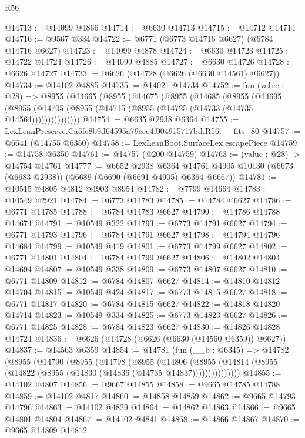 \begin{lexlean}{R56}
\begin{coremodule}
@14713 := @14099 @4866
@14714 := @6630 @14713
@14715 := @14712 @14714
@14716 := @9567 @334
@14722 := @6771 (@6773 @14716 @6627) (@6784 @14716 @6627)
@14723 := @14099 @4878
@14724 := @6630 @14723
@14725 := @14722 @14724
@14726 := @14099 @4885
@14727 := @6630 @14726
@14728 := @6626 @14727
@14733 := @6626 (@14728 (@6626 (@6630 @14561) @6627))
@14734 := @14102 @4885
@14735 := @14021 @14734
@14752 := fun (value : @28) =>
  @8955
    (@14665
      (@8955
        (@14675
          (@8955
            (@14685
              (@8955
                (@14695
                  (@8955 (@14705 (@8955 (@14715 (@8955 (@14725 (@14733 (@14735 @14564)))))))))))))))
@14754 := @6635 @2938 @6364
@14755 := LexLeanPreserve.Ca5fe8b9d64595a79eee4f004915717bd.R56.__fits_80
@14757 := @6641 (@14755 @6350)
@14758 := LexLeanBoot.SurfaceLex.escapePiece
@14759 := @14758 @6350
@14761 := @14757 (@200 @14759)
@14763 := (value : @28) -> @14754 @14761
@14777 := @6652
    @2938
    @6364
    @14761
    @4905
    @10130
    (@6673 (@6683 @2938))
    (@6689 (@6690 (@6691 @4905) @6364 @6667))
@14781 := @10515 @4805 @4812 @4903 @8954
@14782 := @7799 @14664
@14783 := @10549 @2921
@14784 := @6773 @14783
@14785 := @14784 @6627
@14786 := @6771 @14785
@14788 := @6784 @14783 @6627
@14790 := @14786 @14788 @14674
@14791 := @10549 @322
@14793 := @6773 @14791 @6627
@14794 := @6771 @14793
@14796 := @6784 @14791 @6627
@14798 := @14794 @14796 @14684
@14799 := @10549 @419
@14801 := @6773 @14799 @6627
@14802 := @6771 @14801
@14804 := @6784 @14799 @6627
@14806 := @14802 @14804 @14694
@14807 := @10549 @338
@14809 := @6773 @14807 @6627
@14810 := @6771 @14809
@14812 := @6784 @14807 @6627
@14814 := @14810 @14812 @14704
@14815 := @10549 @424
@14817 := @6773 @14815 @6627
@14818 := @6771 @14817
@14820 := @6784 @14815 @6627
@14822 := @14818 @14820 @14714
@14823 := @10549 @334
@14825 := @6773 @14823 @6627
@14826 := @6771 @14825
@14828 := @6784 @14823 @6627
@14830 := @14826 @14828 @14724
@14836 := @6626 (@14728 (@6626 (@6630 (@14560 @6359)) @6627))
@14837 := @14563 @6359
@14854 := @14781
    (fun (__b : @6345) =>
    @14782
      (@8955
        (@14790
          (@8955
            (@14798
              (@8955
                (@14806
                  (@8955 (@14814 (@8955 (@14822 (@8955 (@14830 (@14836 (@14735 @14837)))))))))))))))
@14855 := @14102 @4807
@14856 := @9667 @14855
@14858 := @9665 @14785 @14788
@14859 := @14102 @4817
@14860 := @14858 @14859
@14862 := @9665 @14793 @14796
@14863 := @14102 @4829
@14864 := @14862 @14863
@14866 := @9665 @14801 @14804
@14867 := @14102 @4841
@14868 := @14866 @14867
@14870 := @9665 @14809 @14812

\end{coremodule}
\end{lexlean}
